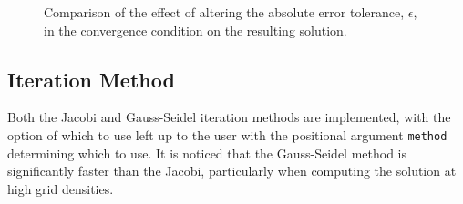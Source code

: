\begin{figure}
    \centering
    \caption{Comparison of the effect of altering the absolute error tolerance, $\epsilon$, in the convergence condition on the resulting solution.}
    \label{fig:tolerances}
\end{figure}

\subsection{Iteration Method}
\label{subsec:convergence_condition}

Both the Jacobi and Gauss-Seidel iteration methods are implemented, with the option of which to use left up to the user with the positional argument \texttt{method} determining which to use. It is noticed that the Gauss-Seidel method is significantly faster than the Jacobi, particularly when computing the solution at high grid densities.

